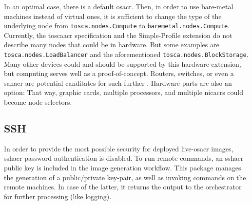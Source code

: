 \newline
In an optimal case, there is a default \gls{osacr}. Then, in order to use bare-metal machines instead of virtual ones, it is sufficient to change the type of the underlying node from \texttt{tosca.nodes.Compute} to \texttt{baremetal.nodes.Compute}.
\newline
Currently, the \gls{toscaacr} specification and the Simple-Profile extension do not describe many nodes that could be  in hardware. But some examples are \texttt{tosca.nodes.LoadBalancer} and the aforementioned \texttt{tosca.nodes.BlockStorage}. Many other devices could and should be supported by this hardware extension, but computing serves well as a proof-of-concept. Routers, switches, or even a \gls{sanacr} are potential canditates for such further . Hardware parts are also an option: That way, graphic cards, multiple processors, and multiple \gls{nicacr}s could become node selectors.

\subsection{SSH}
In order to provide the most possible security for deployed live-\gls{osacr} images, \gls{sshacr} password authentication is disabled. To run remote commands, an \gls{sshacr} public key is included in the image generation workflow. This package manages the generation of a public/private key-pair, as well as invoking commands on the remote machines. In case of the latter, it returns the output to the orchestrator for further processing (like logging).

